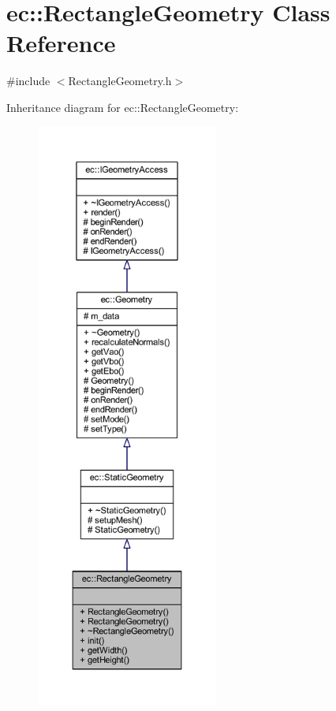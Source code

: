 \hypertarget{classec_1_1_rectangle_geometry}{}\section{ec\+:\+:Rectangle\+Geometry Class Reference}
\label{classec_1_1_rectangle_geometry}


{\ttfamily \#include $<$Rectangle\+Geometry.\+h$>$}



Inheritance diagram for ec\+:\+:Rectangle\+Geometry\+:\nopagebreak
\begin{figure}[H]
\begin{center}
\leavevmode
\includegraphics[height=550pt]{classec_1_1_rectangle_geometry__inherit__graph}
\end{center}
\end{figure}


